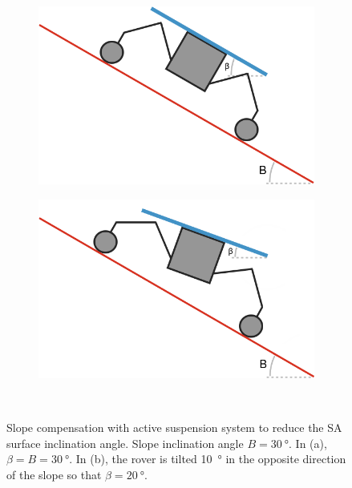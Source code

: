 \begin{figure}[h]
\captionsetup[subfigure]{justification=centering}
	\centering
    \setlength{\subfigureWidth}{0.50\textwidth}
    \setlength{\graphicsHeight}{40mm}
    \hypersetup{hidelinks=true}%
    \begin{subfigure}[t]{\subfigureWidth}
        \centering
        \includegraphics[height=\graphicsHeight]{sections/mars-solar-energy/mission-sites/images/stick-rover-beta-large.png}
        \label{fig:sub:rover-on-slope-beta-large}
    \end{subfigure}\hfill
    \begin{subfigure}[t]{\subfigureWidth}
        \centering
        \includegraphics[height=\graphicsHeight]{sections/mars-solar-energy/mission-sites/images/stick-rover-beta-small.png}
		\label{fig:sub:rover-on-slope-beta-small}
	\end{subfigure}\\[0.8ex]
    \caption[Slope compensation with active suspension system]
            {Slope compensation with active suspension system to reduce the \ac{SA} surface inclination angle. Slope inclination angle $B = \SI{30}{\degree}$. In (a), $\beta = B = \SI{30}{\degree}$. In (b), the rover is tilted  \SI{10}{\degree} in the opposite direction of the slope so that $\beta = \SI{20}{\degree}$.}
    \label{fig:sub:rover-on-slope-beta}
\end{figure}


